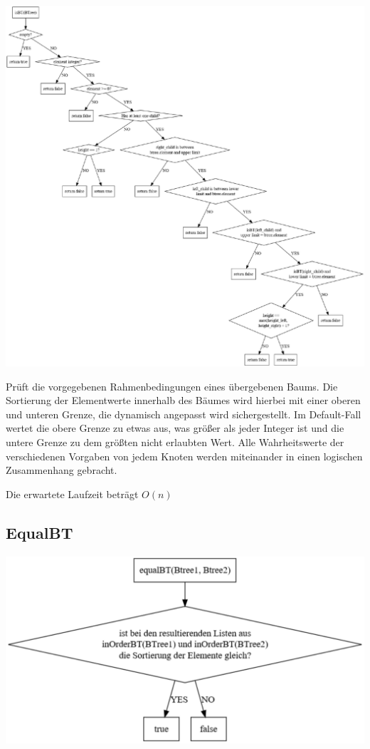 \documentclass[11pt]{article}
\begin{document}
    \begin{center}
        \includegraphics[width=1.2\columnwidth] {isbt.pdf}
    \end{center}

    Prüft die vorgegebenen Rahmenbedingungen eines übergebenen Baums.
    Die Sortierung der Elementwerte innerhalb des Bäumes wird hierbei mit einer oberen und unteren Grenze, die dynamisch angepasst wird sichergestellt. Im Default-Fall wertet die obere Grenze zu etwas aus, was größer als jeder Integer ist und die untere Grenze zu dem größten nicht erlaubten Wert.
    Alle Wahrheitswerte der verschiedenen
    Vorgaben von jedem Knoten werden miteinander in einen logischen
    Zusammenhang gebracht.

    Die erwartete Laufzeit beträgt
    \begin{math}
        O(n)
    \end{math}

    \subsection{EqualBT}\label{subsec:equalbt}
    
    \begin{center}
        \includegraphics[width=1.2\columnwidth] {equal.pdf}
    \end{center}
    
\end{document}
